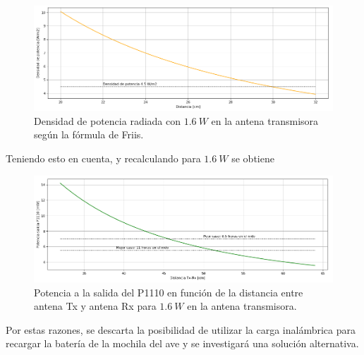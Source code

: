 \begin{figure}[H]
	\centering
	\includegraphics[width=\linewidth]{ImagenesFactibilidad/densidadradiada}
	\caption{Densidad de potencia radiada con $1.6 \ W$ en la antena transmisora según la fórmula de Friis.}
	\label{fig:densidadradiada}
\end{figure}

Teniendo esto en cuenta, y recalculando para $1.6 \ W$ se obtiene

\begin{figure}[H]
	\centering
	\includegraphics[width=\linewidth]{ImagenesFactibilidad/recalculo}
	\caption{Potencia a la salida del P1110 en función de la distancia entre antena Tx y antena Rx para $1.6 \ W$ en la antena transmisora.}
	\label{fig:recalculo}
\end{figure}

Por estas razones, se descarta la posibilidad de utilizar la carga inalámbrica para recargar la batería de la mochila del ave y se investigará una solución alternativa.